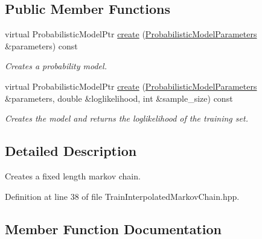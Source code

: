 \subsection*{Public Member Functions}
\begin{DoxyCompactItemize}
\item 
virtual Probabilistic\+Model\+Ptr \hyperlink{classtops_1_1TrainInterpolatedMarkovChain_aecbe1110e2a9c7479340b39e3d3c55ef}{create} (\hyperlink{classtops_1_1ProbabilisticModelParameters}{Probabilistic\+Model\+Parameters} \&parameters) const
\begin{DoxyCompactList}\small\item\em Creates a probability model. \end{DoxyCompactList}\item 
\mbox{\label{classtops_1_1TrainInterpolatedMarkovChain_acf7c060daf7e1ea3e92b9bc739e5f41e}} 
virtual Probabilistic\+Model\+Ptr \hyperlink{classtops_1_1TrainInterpolatedMarkovChain_acf7c060daf7e1ea3e92b9bc739e5f41e}{create} (\hyperlink{classtops_1_1ProbabilisticModelParameters}{Probabilistic\+Model\+Parameters} \&parameters, double \&loglikelihood, int \&sample\+\_\+size) const
\begin{DoxyCompactList}\small\item\em Creates the model and returns the loglikelihood of the training set. \end{DoxyCompactList}\end{DoxyCompactItemize}


\subsection{Detailed Description}
Creates a fixed length markov chain. 

Definition at line 38 of file Train\+Interpolated\+Markov\+Chain.\+hpp.



\subsection{Member Function Documentation}
\mbox{\label{classtops_1_1TrainInterpolatedMarkovChain_aecbe1110e2a9c7479340b39e3d3c55ef}} 
